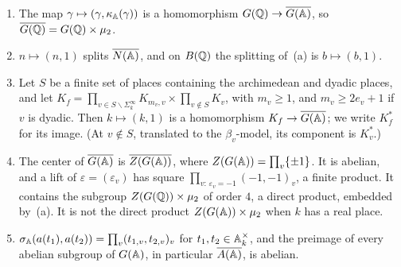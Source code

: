 \begin{lemma}\label{lem:global}
\begin{enumerate}[label=(\alph*)]
\item The map $\gamma\mapsto(\gamma,\kappa_{\mathbb{A}}(\gamma))$ is a homomorphism
  $G(\mathbb{Q})\to\overline{G(\mathbb{A})}$, so $\overline{G(\mathbb{Q})}=G(\mathbb{Q})\times\mu_2$.
\item $n\mapsto(n,1)$ splits $\overline{N(\mathbb{A})}$, and on $B(\mathbb{Q})$ the
  splitting of~(a) is $b\mapsto(b,1)$.
\item Let $S$ be a finite set of places containing the archimedean and
  dyadic places, and let $K_f=\prod_{v\in S\smallsetminus\Sigma_k^\infty}
  K_{m_v,v}\times\prod_{v\notin S}K_v$, with $m_v\ge1$, and $m_v\ge
  2e_v+1$ if $v$ is dyadic. Then $k\mapsto(k,1)$ is a homomorphism
  $K_f\to\overline{G(\mathbb{A})}$; we write $K_f^*$ for its image. (At $v\notin S$,
  translated to the $\beta_v$-model, its component is $K_v^*$.)
\item The center of $\overline{G(\mathbb{A})}$ is $\overline{Z(G(\mathbb{A}))}$,
  where $Z(G(\mathbb{A}))=\prod_v\{\pm1\}$. It is abelian, and a lift of
  $\varepsilon=(\varepsilon_v)$ has square
  $\prod_{v:\,\varepsilon_v=-1}(-1,-1)_v$, a finite product. It contains the
  subgroup $Z(G(\mathbb{Q}))\times\mu_2$ of order $4$, a direct product, embedded
  by~(a). It is not the direct product $Z(G(\mathbb{A}))\times\mu_2$ when $k$ has
  a real place.
\item $\sigma_{\mathbb{A}}(a(t_1),a(t_2))=\prod_v(t_{1,v},t_{2,v})_v$ for
  $t_1,t_2\in\mathbb{A}_k^\times$, and the preimage of every abelian subgroup of
  $G(\mathbb{A})$, in particular $\overline{A(\mathbb{A})}$, is abelian.
\end{enumerate}
\end{lemma}

